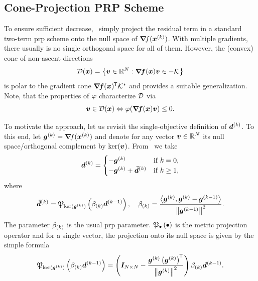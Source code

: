 \documentclass{article}
\theoremstyle{plain}
\theoremstyle{definition}
\begin{document}
\subsection{Cone-Projection PRP Scheme}

To ensure sufficient decrease,~\citet{chengTwoTermPRPBasedDescent2007}
simply project the residual term in a standard two-term \ac{prp}
scheme onto the null space of $\bm{\nabla}\!f(\bm{x}^{(k)})$.
With multiple gradients, there usually is no single orthogonal
space for all of them.
However, the (convex) cone of non-ascent directions
$$
\mathcal D(\bm{x}) = \left\{
	\bm{v} \in \mathbb R^N: \bm{\nabla}\!\bm{f}(\bm{x})\bm{v}
	\in -\mathcal K
\right\}
$$
is polar to the gradient cone $\bm{\nabla}\!\bm{f}(\bm{x})^{\mkern-1.5mu\mathsf{T}}\mathcal K^*$
and provides a suitable generalization.
Note, that the properties of $\varphi$ characterize $\mathcal D$ via
$$
\bm{v} \in \mathcal D(\bm{x})
\Leftrightarrow
\varphi(\bm{\nabla}\!\bm{f}(\bm{x})\bm{v}) \leq 0.
$$

To motivate the approach, let us revisit the single-objective
definition of $\bm{d}^{(k)}$.
To this end, let $\bm{g}^{(k)} = \bm{\nabla}\!f(\bm{x}^{(k)})$ and denote for any
vector $\bm{v}\in \mathbb R^N$ its null space/orthogonal complement 
by $\operatorname*{ker}(\bm{v})$. From~\cite{chengTwoTermPRPBasedDescent2007} we take
$$
\bm{d}^{(k)} = \begin{cases}
	-\bm{g}^{(k)} &\text{if $k=0$},\\
	-\bm{g}^{(k)} + \bm{\bar{d}}^{(k)}
		&\text{if $k \geq 1$},
	\end{cases}
$$
where 
$$
\bm{\bar{d}}^{(k)} = \mathfrak P_{\operatorname*{ker}(\bm{g}^{(k)})}\left(\beta_{(k)} \bm{d}^{(k-1)}\right),
\quad
\beta_{(k)} = \frac{
	{\left\langle \bm{g}^{(k)}, \bm{g}^{(k)} - \bm{g}^{(k-1)} \right\rangle}}{\left\|\bm{g}^{(k-1)}\right\|^2}.
$$
The parameter $\beta_{(k)}$ is the usual \ac{prp} parameter.
$\mathfrak P_{\bullet}\left(\bullet\right)$ is the metric projection operator and for a single 
vector, the projection onto its null space is given by
the simple formula
$$
\mathfrak P_{\operatorname*{ker}(\bm{g}^{(k)})}\left(\beta_{(k)} \bm{d}^{(k-1)}\right)
=
\left(\bm{I}_{N\times N}
-\frac{\bm{g}^{(k)}\left(\bm{g}^{(k)}\right)^{\mkern-1.5mu\mathsf{T}}}{\left\|\bm{g}^{(k)}\right\|^2}
\right)
\beta_{(k)} \bm{d}^{(k-1)}.
$$
\end{document}
